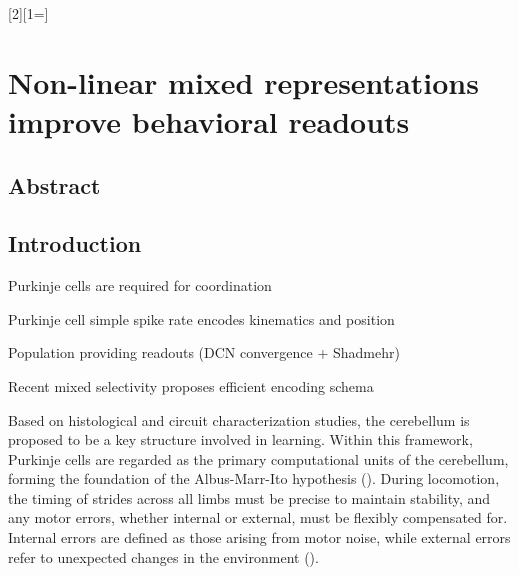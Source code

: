 
%
\label{cha:neurobehav}

[2][1=]{}

\chapter{Non-linear mixed representations improve behavioral readouts} 

\pagebreak

\section{Abstract}
\section{Introduction}


\begin{compactitem}
    \scriptsize
    \item Purkinje cells are required for coordination
    \item Purkinje cell simple spike rate encodes kinematics and position
    \item Population providing readouts (DCN convergence + Shadmehr)
    \item Recent mixed selectivity proposes efficient encoding schema
\end{compactitem}

\vspace{10pt}

Based on histological and circuit characterization studies, the cerebellum is proposed to be a key structure involved in learning. Within this framework, Purkinje cells are regarded as the primary computational units of the cerebellum, forming the foundation of the Albus-Marr-Ito hypothesis ().
During locomotion, the timing of strides across all limbs must be precise to maintain stability, and any motor errors, whether internal or external, must be flexibly compensated for. Internal errors are defined as those arising from motor noise, while external errors refer to unexpected changes in the environment ().

